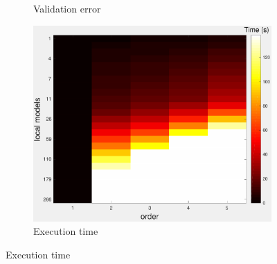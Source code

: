 \documentclass[letterpaper, 10 pt, conference]{ieeeconf}  %
\begin{document}
\begin{figure}[thpb]
\begin{subfigure}[b]{1in}
                \caption{Validation error}
                \label{fig:crossval_train}
        \end{subfigure}
                \begin{subfigure}[b]{1in} 
                \centering
                \includegraphics[width=\textwidth]{figures/cross_allQP3.pdf}
                \caption{Execution time}
                \label{fig:crossval_train}
        \end{subfigure}
\end{figure}
\end{document}
